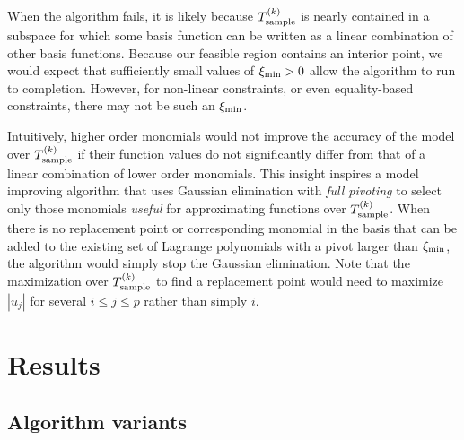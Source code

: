 
When the algorithm fails, it is likely because ${T_{\text{sample}}^{(k)}}$ is nearly contained in a subspace 
for which some basis function can be written as a linear combination of other basis functions.
Because our feasible region contains an interior point, we would expect that sufficiently small values of $\xi_{\text{min}}>0$ allow the algorithm to run to completion.
However, for non-linear constraints, or even equality-based constraints, there may not be such an $\xi_{\text{min}}$.

Intuitively, higher order monomials would not improve the accuracy of the model over ${T_{\text{sample}}^{(k)}}$ 
if their function values do not significantly differ from that of a linear combination of lower order monomials.
This insight inspires a model improving algorithm that uses Gaussian elimination with {\em full pivoting}
to select only those monomials {\em useful} for approximating functions over ${T_{\text{sample}}^{(k)}}$.
When there is no replacement point or corresponding monomial in the basis that can be added to the existing set of Lagrange polynomials with a pivot larger than $\xi_{\text{min}}$,
the algorithm would simply stop the Gaussian elimination.
Note that the maximization over ${T_{\text{sample}}^{(k)}}$ to find a replacement point would need to maximize $|u_j|$ for several $i \le j \le p$ rather than simply $i$.


\section{Results}

\subsection{Algorithm variants}

